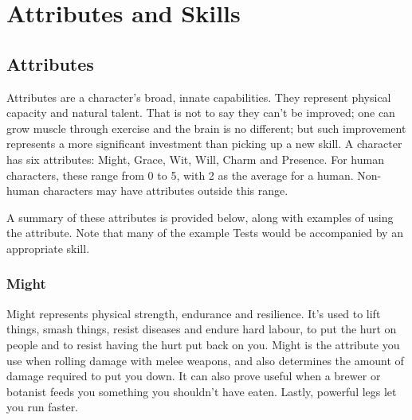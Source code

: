 \chapter{Attributes and Skills}

\section{Attributes}

Attributes are a character's broad, innate capabilities.
They represent physical capacity and natural talent.
That is not to say they can't be improved; one can grow muscle through exercise and the brain is no different; but such improvement represents a more significant investment than picking up a new skill.
A character has six attributes: Might, Grace, Wit, Will, Charm and Presence.
For human characters, these range from 0 to 5, with 2 as the average for a human.
Non-human characters may have attributes outside this range.

A summary of these attributes is provided below, along with examples of using the attribute.
Note that many of the example Tests would be accompanied by an appropriate skill.

\subsection{Might}

Might represents physical strength, endurance and resilience.
It's used to lift things, smash things, resist diseases and endure hard labour, to put the hurt on people and to resist having the hurt put back on you.
Might is the attribute you use when rolling damage with melee weapons, and also determines the amount of damage required to put you down.
It can also prove useful when a brewer or botanist feeds you something you shouldn't have eaten.
Lastly, powerful legs let you run faster.

%

